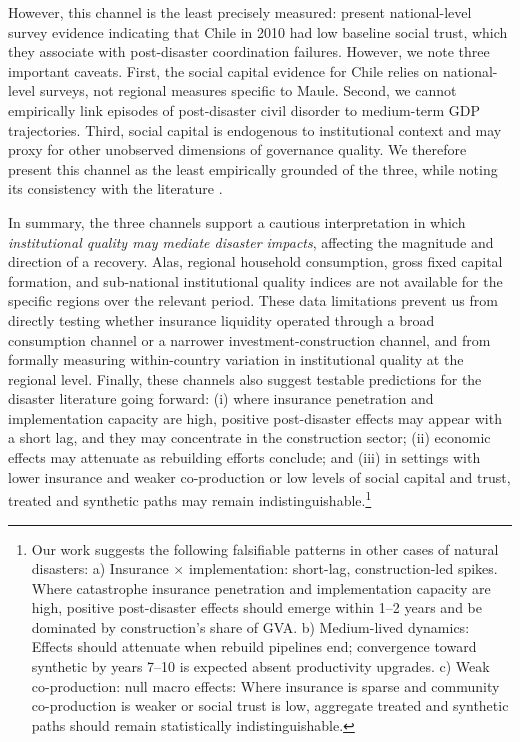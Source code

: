 \documentclass[12pt]{article}
\begin{document}
However, this channel is the least precisely measured: \textcite{dussaillant2014trust} present national-level survey evidence indicating that Chile in 2010 had low baseline social trust, which they associate with post-disaster coordination failures. However, we note three important caveats. First, the social capital evidence for Chile relies on national-level surveys, not regional measures specific to Maule. Second, we cannot empirically link episodes of post-disaster civil disorder to medium-term GDP trajectories. Third, social capital is endogenous to institutional context and may proxy for other unobserved dimensions of governance quality. We therefore present this channel as the least empirically grounded of the three, while noting its consistency with the literature \parencite{aldrich2015social,storr2016community}.

In summary, the three channels support a cautious interpretation in which \emph{institutional quality may mediate disaster impacts}, affecting the magnitude and direction of a recovery. Alas, regional household consumption, gross fixed capital formation, and sub-national institutional quality indices are not available for the specific regions over the relevant period. These data limitations prevent us from directly testing whether insurance liquidity operated through a broad consumption channel or a narrower investment-construction channel, and from formally measuring within-country variation in institutional quality at the regional level. Finally, these channels also suggest testable predictions for the disaster literature going forward: (i) where insurance penetration and implementation capacity are high, positive post-disaster effects may appear with a short lag, and they may concentrate in the construction sector; (ii) economic effects may attenuate as rebuilding efforts conclude; and (iii) in settings with lower insurance and weaker co-production or low levels of social capital and trust, treated and synthetic paths may remain indistinguishable.\footnote{Our work suggests the following falsifiable patterns in other cases of natural disasters: a) Insurance $\times$ implementation: short-lag, construction-led spikes. Where catastrophe insurance penetration and implementation capacity are high, positive post-disaster effects should emerge within 1--2 years and be dominated by construction's share of GVA. b) Medium-lived dynamics: Effects should attenuate when rebuild pipelines end; convergence toward synthetic by years 7--10 is expected absent productivity upgrades. c) Weak co-production: null macro effects: Where insurance is sparse and community co-production is weaker or social trust is low, aggregate treated and synthetic paths should remain statistically indistinguishable.}
\end{document}

